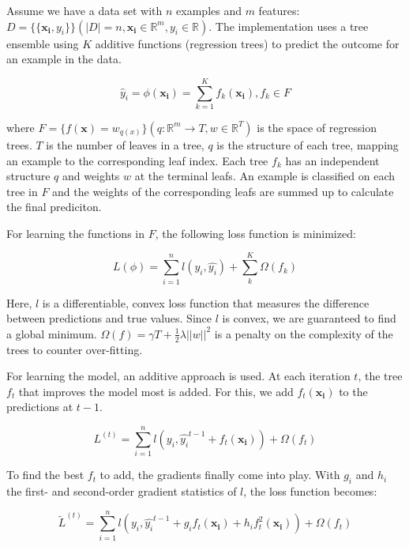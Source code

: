 \documentclass[
  11pt,
  a4paper,
  DIV=12,captions=tableheading,oneside]{scrbook}
\begin{document}
Assume we have a data set with \(n\) examples and \(m\) features: \(D = \{\{\mathbf{x_i}, y_i\}\} ( |D| = n, \mathbf{x_i} \in \mathbb{R}^m, y_i \in \mathbb{R})\). The implementation uses a tree ensemble using \(K\) additive functions (regression trees) to predict the outcome for an example in the data.

\begin{equation}
\hat{y}_i = \phi(\mathbf{x_i}) = \sum_{k=1}^K f_k(\mathbf{x_i}), f_k \in F
\label{eq:gbm-ensemble}
\end{equation}

where \(F = \{f(\mathbf{x}) = w_{q(x)}\} (q: \mathbb{R}^m \rightarrow T, w \in \mathbb{R}^T)\) is the space of regression trees. \(T\) is the number of leaves in a tree, \(q\) is the structure of each tree, mapping an example to the corresponding leaf index. Each tree \(f_k\) has an independent structure \(q\) and weights \(w\) at the terminal leafs. An example is classified on each tree in \(F\) and the weights of the corresponding leafs are summed up to calculate the final prediciton.

For learning the functions in \(F\), the following loss function is minimized:

\begin{equation}
L(\phi) = \sum_{i=1}^n l(y_i, \hat{y_i}) + \sum_k^K \Omega(f_k)
\label{eq:gbm-loss}
\end{equation}

Here, \(l\) is a differentiable, convex loss function that measures the difference between predictions and true values. Since \(l\) is convex, we are guaranteed to find a global minimum. \(\Omega(f) = \gamma T + \frac{1}{2}\lambda||w||^2\) is a penalty on the complexity of the trees to counter over-fitting.

For learning the model, an additive approach is used. At each iteration \(t\), the tree \(f_t\) that improves the model most is added. For this, we add \(f_t(\mathbf{x_i})\) to the predictions at \(t-1\).

\begin{equation}
L^{(t)} = \sum_{i=1}^n l(y_i, \hat{y_i}^{t-1} + f_t(\mathbf{x_i})) +\Omega(f_t)
\label{eq:gbm-iterate}
\end{equation}

To find the best \(f_t\) to add, the gradients finally come into play. With \(g_i\) and \(h_i\) the first- and second-order gradient statistics of \(l\), the loss function becomes:

\begin{equation}
\tilde{L}^{(t)} = \sum_{i=1}^n l(y_i, \hat{y_i}^{t-1} + g_if_t(\mathbf{x_i}) + h_i f_t^2(\mathbf{x_i})) +\Omega(f_t)
\label{eq:gbm-grad}
\end{equation}
\end{document}
